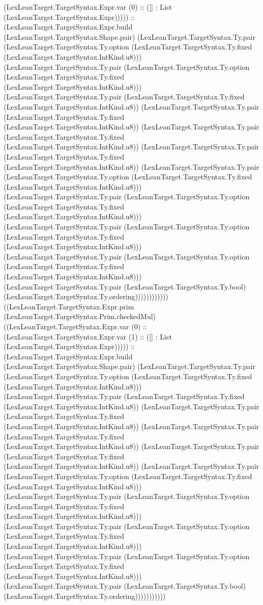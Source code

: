 \documentclass[11pt]{article}
\begin{document}
(LexLeanTarget.TargetSyntax.Expr.var (0) :: ([] : List (LexLeanTarget.TargetSyntax.Expr))))) :: (LexLeanTarget.TargetSyntax.Expr.build (LexLeanTarget.TargetSyntax.Shape.pair) (LexLeanTarget.TargetSyntax.Ty.pair (LexLeanTarget.TargetSyntax.Ty.option (LexLeanTarget.TargetSyntax.Ty.fixed (LexLeanTarget.TargetSyntax.IntKind.u8))) (LexLeanTarget.TargetSyntax.Ty.pair (LexLeanTarget.TargetSyntax.Ty.option (LexLeanTarget.TargetSyntax.Ty.fixed (LexLeanTarget.TargetSyntax.IntKind.u8))) (LexLeanTarget.TargetSyntax.Ty.pair (LexLeanTarget.TargetSyntax.Ty.fixed (LexLeanTarget.TargetSyntax.IntKind.u8)) (LexLeanTarget.TargetSyntax.Ty.pair (LexLeanTarget.TargetSyntax.Ty.fixed (LexLeanTarget.TargetSyntax.IntKind.u8)) (LexLeanTarget.TargetSyntax.Ty.pair (LexLeanTarget.TargetSyntax.Ty.fixed (LexLeanTarget.TargetSyntax.IntKind.u8)) (LexLeanTarget.TargetSyntax.Ty.pair (LexLeanTarget.TargetSyntax.Ty.fixed (LexLeanTarget.TargetSyntax.IntKind.u8)) (LexLeanTarget.TargetSyntax.Ty.pair (LexLeanTarget.TargetSyntax.Ty.option (LexLeanTarget.TargetSyntax.Ty.fixed (LexLeanTarget.TargetSyntax.IntKind.u8))) (LexLeanTarget.TargetSyntax.Ty.pair (LexLeanTarget.TargetSyntax.Ty.option (LexLeanTarget.TargetSyntax.Ty.fixed (LexLeanTarget.TargetSyntax.IntKind.u8))) (LexLeanTarget.TargetSyntax.Ty.pair (LexLeanTarget.TargetSyntax.Ty.option (LexLeanTarget.TargetSyntax.Ty.fixed (LexLeanTarget.TargetSyntax.IntKind.u8))) (LexLeanTarget.TargetSyntax.Ty.pair (LexLeanTarget.TargetSyntax.Ty.option (LexLeanTarget.TargetSyntax.Ty.fixed (LexLeanTarget.TargetSyntax.IntKind.u8))) (LexLeanTarget.TargetSyntax.Ty.pair (LexLeanTarget.TargetSyntax.Ty.bool) (LexLeanTarget.TargetSyntax.Ty.ordering)))))))))))) ((LexLeanTarget.TargetSyntax.Expr.prim (LexLeanTarget.TargetSyntax.Prim.checkedMul) ((LexLeanTarget.TargetSyntax.Expr.var (0) :: (LexLeanTarget.TargetSyntax.Expr.var (1) :: ([] : List (LexLeanTarget.TargetSyntax.Expr))))) :: (LexLeanTarget.TargetSyntax.Expr.build (LexLeanTarget.TargetSyntax.Shape.pair) (LexLeanTarget.TargetSyntax.Ty.pair (LexLeanTarget.TargetSyntax.Ty.option (LexLeanTarget.TargetSyntax.Ty.fixed (LexLeanTarget.TargetSyntax.IntKind.u8))) (LexLeanTarget.TargetSyntax.Ty.pair (LexLeanTarget.TargetSyntax.Ty.fixed (LexLeanTarget.TargetSyntax.IntKind.u8)) (LexLeanTarget.TargetSyntax.Ty.pair (LexLeanTarget.TargetSyntax.Ty.fixed (LexLeanTarget.TargetSyntax.IntKind.u8)) (LexLeanTarget.TargetSyntax.Ty.pair (LexLeanTarget.TargetSyntax.Ty.fixed (LexLeanTarget.TargetSyntax.IntKind.u8)) (LexLeanTarget.TargetSyntax.Ty.pair (LexLeanTarget.TargetSyntax.Ty.fixed (LexLeanTarget.TargetSyntax.IntKind.u8)) (LexLeanTarget.TargetSyntax.Ty.pair (LexLeanTarget.TargetSyntax.Ty.option (LexLeanTarget.TargetSyntax.Ty.fixed (LexLeanTarget.TargetSyntax.IntKind.u8))) (LexLeanTarget.TargetSyntax.Ty.pair (LexLeanTarget.TargetSyntax.Ty.option (LexLeanTarget.TargetSyntax.Ty.fixed (LexLeanTarget.TargetSyntax.IntKind.u8))) (LexLeanTarget.TargetSyntax.Ty.pair (LexLeanTarget.TargetSyntax.Ty.option (LexLeanTarget.TargetSyntax.Ty.fixed (LexLeanTarget.TargetSyntax.IntKind.u8))) (LexLeanTarget.TargetSyntax.Ty.pair (LexLeanTarget.TargetSyntax.Ty.option (LexLeanTarget.TargetSyntax.Ty.fixed (LexLeanTarget.TargetSyntax.IntKind.u8))) (LexLeanTarget.TargetSyntax.Ty.pair (LexLeanTarget.TargetSyntax.Ty.bool) (LexLeanTarget.TargetSyntax.Ty.ordering))))))))))) 
\end{document}
